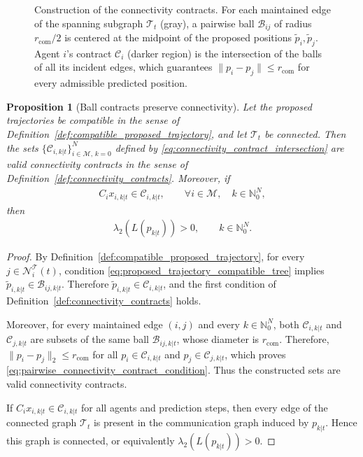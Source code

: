 \documentclass[letterpaper, 10 pt, conference]{ieeeconf}  %
\newtheorem{proposition}{Proposition}
\begin{document}
\begin{figure}[t]
	\caption{Construction of the connectivity contracts. For each maintained
		edge of the spanning subgraph $\mathcal{T}_t$ (gray), a pairwise ball
		$\mathcal{B}_{ij}$ of radius $r_{\mathrm{com}}/2$ is centered at the
		midpoint of the proposed positions $\tilde p_i,\tilde p_j$. Agent $i$'s
		contract $\mathcal{C}_{i}$ (darker region) is the intersection of the
		balls of all its incident edges, which guarantees
		$\|p_i-p_j\|\le r_{\mathrm{com}}$ for every admissible predicted position.}
	\label{fig:contracts_construction}
\end{figure}

\begin{proposition}[Ball contracts preserve connectivity]
	\label{prop:ball_contracts_preserve_connectivity}
	Let the proposed trajectories be compatible in the sense of
	Definition~\ref{def:compatible_proposed_trajectory}, and let
	$\mathcal{T}_t$ be connected. Then the sets
	$\{\mathcal{C}_{i,k|t}\}_{i\in\mathcal{M},\,k=0}^{N}$ defined by
	\eqref{eq:connectivity_contract_intersection} are valid connectivity contracts
	in the sense of Definition~\ref{def:connectivity_contracts}. Moreover, if
	\begin{align}
		C_i x_{i,k|t}\in\mathcal{C}_{i,k|t},
		\qquad
		\forall i\in\mathcal{M},\quad k\in\mathbb{N}_0^N,
	\end{align}
	then
	\begin{align}
		\lambda_2\!\left(L(p_{k|t})\right)>0,
		\qquad
		k\in\mathbb{N}_0^N.
	\end{align}
\end{proposition}

\begin{proof}
	By Definition~\ref{def:compatible_proposed_trajectory}, for every
	$j\in\mathcal{N}^{\mathcal{T}}_i(t)$, condition
	\eqref{eq:proposed_trajectory_compatible_tree} implies
	$\tilde p_{i,k|t}\in\mathcal{B}_{ij,k|t}$. Therefore
	$\tilde p_{i,k|t}\in\mathcal{C}_{i,k|t}$, and the first condition of
	Definition~\ref{def:connectivity_contracts} holds.

	Moreover, for every maintained edge $(i,j)$ and every
	$k\in\mathbb{N}_0^N$, both $\mathcal{C}_{i,k|t}$ and
	$\mathcal{C}_{j,k|t}$ are subsets of the same ball
	$\mathcal{B}_{ij,k|t}$, whose diameter is $r_{\mathrm{com}}$.
	Therefore, $\|p_i-p_j\|_2\leq r_{\mathrm{com}}$ for all
	$p_i\in\mathcal{C}_{i,k|t}$ and
	$p_j\in\mathcal{C}_{j,k|t}$, which proves
	\eqref{eq:pairwise_connectivity_contract_condition}. Thus the constructed sets
	are valid connectivity contracts.

	If $C_i x_{i,k|t}\in\mathcal{C}_{i,k|t}$ for all agents and prediction steps,
	then every edge of the connected graph $\mathcal{T}_t$ is present in the
	communication graph induced by $p_{k|t}$. Hence this graph is connected, or
	equivalently $\lambda_2(L(p_{k|t}))>0$.
\end{proof}
\end{document}
